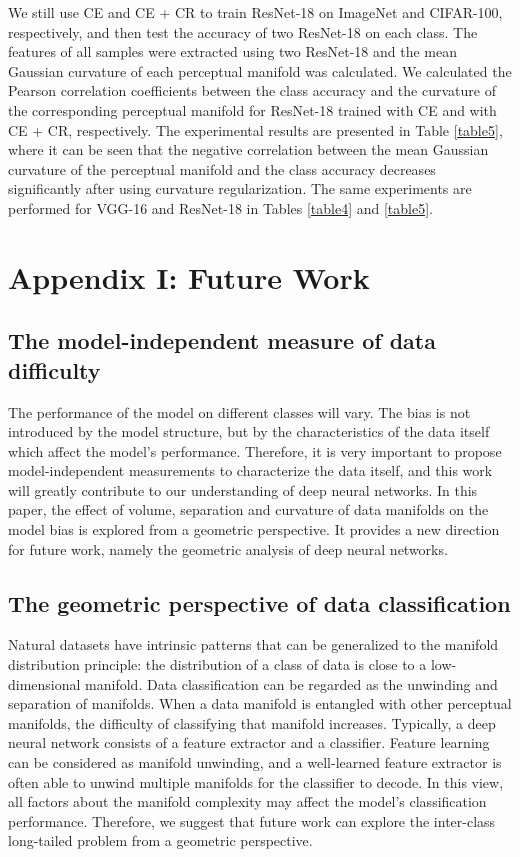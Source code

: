 \documentclass[10pt,twocolumn,letterpaper]{article}
\begin{document}
We still use CE and CE + CR to train ResNet-18 on ImageNet and CIFAR-100, respectively, and then test the accuracy of two ResNet-18 on each class. The features of all samples were extracted using two ResNet-18 and the mean Gaussian curvature of each perceptual manifold was calculated. We calculated the Pearson correlation coefficients between the class accuracy and the curvature of the corresponding perceptual manifold for ResNet-18 trained with CE and with CE + CR, respectively. The experimental results are presented in Table \ref{table5}, where it can be seen that the negative correlation between the mean Gaussian curvature of the perceptual manifold and the class accuracy decreases significantly after using curvature regularization. The same experiments are performed for VGG-16 and ResNet-18 in Tables \ref{table4} and \ref{table5}.


\section*{Appendix I: Future Work}
\label{secI}

\subsection*{The model-independent measure of data difficulty}

The performance of the model on different classes will vary. The bias is not introduced by the model structure, but by the characteristics of the data itself which affect the model's performance. Therefore, it is very important to propose model-independent measurements to characterize the data itself, and this work will greatly contribute to our understanding of deep neural networks. In this paper, the effect of volume, separation and curvature of data manifolds on the model bias is explored from a geometric perspective. It provides a new direction for future work, namely the geometric analysis of deep neural networks.

\subsection*{The geometric perspective of data classification}

Natural datasets have intrinsic patterns that can be generalized to the manifold distribution principle: the distribution of a class of data is close to a low-dimensional manifold. Data classification can be regarded as the unwinding and separation of manifolds. When a data manifold is entangled with other perceptual manifolds, the difficulty of classifying that manifold increases. Typically, a deep neural network consists of a feature extractor and a classifier. Feature learning can be considered as manifold unwinding, and a well-learned feature extractor is often able to unwind multiple manifolds for the classifier to decode. In this view, all factors about the manifold complexity may affect the model's classification performance. Therefore, we suggest that future work can explore the inter-class long-tailed problem from a geometric perspective.
\end{document}
